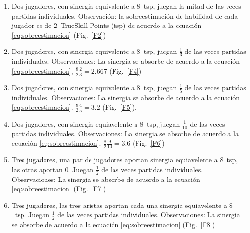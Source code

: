 \documentclass[a4paper,11pt]{book}
\theoremstyle{definition}
\begin{document}
\begin{enumerate}
 
 \item Dos jugadores, con sinergia equivalente a $8$~tsp, juegan la mitad de las veces partidas individuales. Observaci\'on: la sobreestimaci\'on de habilidad de cada jugador es de $2$~TrueSkill Points (tsp) de acuerdo a la ecuaci\'on \ref{eq:sobreestimacion} (Fig.~\ref{F2})
 
 \item Dos jugadores, con sinergia equivalente a $8$~tsp, juegan $\frac{1}{3}$ de las veces partidas individuales. Observaciones: La sinergia se absorbe de acuerdo a la ecuaci\'on \ref{eq:sobreestimacion}, $\frac{8}{2}\frac{2}{3} = 2.667$ (Fig.~\ref{F4})
  
 \item Dos jugadores, con sinergia equivalente a $8$~tsp, juegan $\frac{1}{5}$ de las veces partidas individuales. Observaciones: La sinergia se absorbe de acuerdo a la ecuaci\'on \ref{eq:sobreestimacion}. $\frac{8}{2}\frac{4}{5} = 3.2$ (Fig.~\ref{F5}).
  
 \item Dos jugadores, con sinergia equiavelente a $8$~tsp, juegan $\frac{1}{10}$ de las veces partidas individuales. Observaciones: La sinergia se absorbe de acuerdo a la ecuaci\'on \ref{eq:sobreestimacion}. $\frac{8}{2}\frac{9}{10} = 3.6 $ (Fig.~\ref{F6})
  
 \item  Tres jugadores, una par de jugadores aportan sinergia equiavelente a $8$~tsp, las otras aportan $0$. Juegan $\frac{1}{2}$ de las veces partidas individuales. Observaciones: La sinergia se absorbe de acuerdo a la ecuaci\'on \ref{eq:sobreestimacion} (Fig.~\ref{F7})
 
 \item  Tres jugadores, las tres aristas aportan cada una sinergia equiavelente a $8$~tsp. Juegan $\frac{1}{2}$ de las veces partidas individuales. Observaciones: La sinergia se absorbe de acuerdo a la ecuaci\'on \ref{eq:sobreestimacion} (Fig.~\ref{F8})
 
\end{enumerate}
\end{document}
